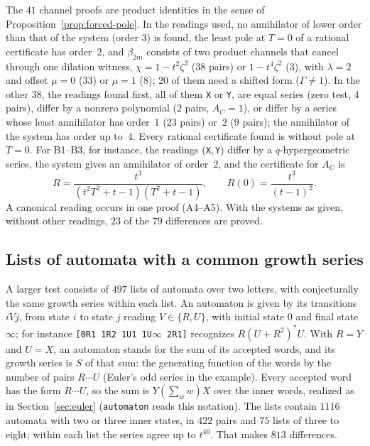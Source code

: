 \documentclass[11pt,a4paper]{article}
\theoremstyle{plain}
\theoremstyle{definition}
\theoremstyle{remark}
\begin{document}
The $41$ channel proofs are product identities in the sense of
Proposition~\ref{prop:forced-pole}. In the readings used, no annihilator of
lower order than that of the system (order $3$) is found, the least pole at
$T=0$ of a rational certificate has order~$2$, and $\beta_{2m}$ consists of two
product channels that cancel through one dilation witness, $\chi=1-t^2\zeta^2$
($38$ pairs) or $1-t^4\zeta^2$ ($3$), with $\lambda=2$ and offset $\mu=0$ ($33$)
or $\mu=1$ ($8$); $20$ of them need a shifted form ($\Gamma\ne1$).
In the other $38$, the readings found first, all of them \texttt{X} or
\texttt{Y}, are equal series (zero test, $4$ pairs), differ by a nonzero
polynomial ($2$ pairs, $A_C=1$), or differ by a series whose least annihilator
has order~$1$ ($23$ pairs) or~$2$ ($9$ pairs); the annihilator of the system has
order up to~$4$. Every rational certificate found is without pole at $T=0$. For
B1--B3, for instance, the readings (\texttt{X},\,\texttt{Y}) differ by a
$q$-hypergeometric series, the system gives an annihilator of order~$2$, and
the certificate for $A_C$ is
\[
  R=\frac{t^3}{(t^2T^2+t-1)(T^2+t-1)},\qquad R(0)=\frac{t^3}{(t-1)^2}.
\]
A canonical reading occurs in one proof (A4--A5). With the systems as given,
without other readings, $23$ of the $79$ differences are proved.

\subsection{Lists of automata with a common growth series}\label{sec:automata}
A larger test consists of $497$ lists of automata over two letters, with
conjecturally the same growth series within each list. An automaton is given by
its transitions $iVj$, from state $i$ to state $j$ reading $V\in\{R,U\}$, with
initial state $0$ and final state $\infty$; for instance
\texttt{[0R1 1R2 1U1 1U$\infty$ 2R1]} recognizes $R(U+R^2)^*U$. With $R=Y$ and $U=X$,
an automaton stands for the sum of its accepted words, and its growth series is
$S$ of that sum: the generating function of the words by the number of pairs
$R\cdots U$ (Euler's odd series in the example). Every accepted word has the form
$R\cdots U$, so the sum is $Y(\sum_ww)X$ over the inner words, realized as in
Section~\ref{sec:euler} (\texttt{automaton} reads this notation). The lists
contain $1116$ automata with two or three inner states, in $422$ pairs and $75$
lists of three to eight; within each list the series agree up to $t^{40}$. That
makes $813$ differences.
\end{document}
